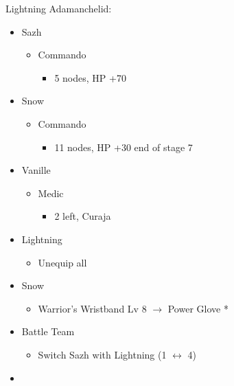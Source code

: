 \begin{center}
Lightning Adamanchelid:
\end{center}
\begin{menu}
\begin{itemize}
    \crystarium
    \begin{itemize}
        \item Sazh
        \begin{itemize}
            \item Commando
            \begin{itemize}
                \item 5 nodes, HP +70
            \end{itemize}
        \end{itemize}
        \item Snow
        \begin{itemize}
            \item Commando
            \begin{itemize}
                \item 11 nodes, HP +30 end of stage 7
            \end{itemize}
        \end{itemize}
        \item Vanille
        \begin{itemize}
            \item Medic
            \begin{itemize}
                \item 2 left, Curaja
            \end{itemize}
        \end{itemize}
    \end{itemize}
    \equip
    \begin{itemize}
        \item Lightning
        \begin{itemize}
            \item Unequip all
        \end{itemize}
        \item Snow
        \begin{itemize}
            \item Warrior's Wristband Lv 8 $\rightarrow$ Power Glove *
        \end{itemize}
    \end{itemize}
    \paradigm
    \begin{itemize}
        \item Battle Team
        \begin{itemize}
            \item Switch Sazh with Lightning (1 $\leftrightarrow$ 4)
        \end{itemize}
        \item {}%
{\paradigmline{\com}{\sen}{\med}}%
{\paradigmline{(\rav)}{\rav}{\rav}}%
{\paradigmline{(\rav)}{\sen}{(\rav)}}%
{\paradigmline[4]{\textit{(\com)}}{\textit{\com}}{\textit{(\com)}}}%
{\paradigmline{\rav}{\com}{(\com)}}%
{\paradigmline{\rav}{\com}{(\rav)}}
    \end{itemize}
\end{itemize}
\end{menu}
